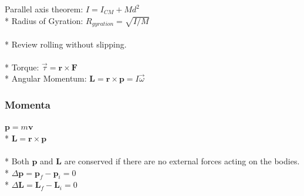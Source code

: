 Parallel axis theorem: \(I=I_{CM}+Md^2\)\\*
Radius of Gyration: \(R_{gyration}=\sqrt{I/M}\)\\\\*
Review rolling without slipping.\\\\*
Torque: \(\vec{\tau}=\mathbf{r}\times\mathbf{F}\)\\*
Angular Momentum: \(\mathbf{L}=\mathbf{r}\times\mathbf{p}=I\vec{\omega}\)

\subsubsection{Momenta}
\(\mathbf{p}=m\mathbf{v}\)\\*
\(\mathbf{L}=\mathbf{r}\times\mathbf{p}\)\\\\*
Both \( \mathbf{p} \) and \( \mathbf{L} \) are conserved if there are no external forces acting on the bodies.\\*
\(\Delta \mathbf{p}=\mathbf{p}_f-\mathbf{p}_i=0\)\\*
\(\Delta \mathbf{L}=\mathbf{L}_f-\mathbf{L}_i=0\)


